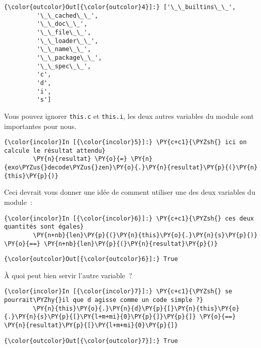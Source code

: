 \begin{Verbatim}[commandchars=\\\{\}]
{\color{outcolor}Out[{\color{outcolor}4}]:} ['\_\_builtins\_\_',
         '\_\_cached\_\_',
         '\_\_doc\_\_',
         '\_\_file\_\_',
         '\_\_loader\_\_',
         '\_\_name\_\_',
         '\_\_package\_\_',
         '\_\_spec\_\_',
         'c',
         'd',
         'i',
         's']
\end{Verbatim}
            
    Vous pouvez ignorer \texttt{this.c} et \texttt{this.i}, les deux autres
variables du module sont importantes pour nous.

    \begin{Verbatim}[commandchars=\\\{\}]
{\color{incolor}In [{\color{incolor}5}]:} \PY{c+c1}{\PYZsh{} ici on calcule le résultat attendu}
        \PY{n}{resultat} \PY{o}{=} \PY{n}{exo\PYZus{}decode\PYZus{}zen}\PY{o}{.}\PY{n}{resultat}\PY{p}{(}\PY{n}{this}\PY{p}{)}
\end{Verbatim}


    Ceci devrait vous donner une idée de comment utiliser une des deux
variables du module~:

    \begin{Verbatim}[commandchars=\\\{\}]
{\color{incolor}In [{\color{incolor}6}]:} \PY{c+c1}{\PYZsh{} ces deux quantités sont égales}
        \PY{n+nb}{len}\PY{p}{(}\PY{n}{this}\PY{o}{.}\PY{n}{s}\PY{p}{)} \PY{o}{==} \PY{n+nb}{len}\PY{p}{(}\PY{n}{resultat}\PY{p}{)}
\end{Verbatim}


\begin{Verbatim}[commandchars=\\\{\}]
{\color{outcolor}Out[{\color{outcolor}6}]:} True
\end{Verbatim}
            
    À quoi peut bien servir l'autre variable~?

    \begin{Verbatim}[commandchars=\\\{\}]
{\color{incolor}In [{\color{incolor}7}]:} \PY{c+c1}{\PYZsh{} se pourrait\PYZhy{}il que d agisse comme un code simple ?}
        \PY{n}{this}\PY{o}{.}\PY{n}{d}\PY{p}{[}\PY{n}{this}\PY{o}{.}\PY{n}{s}\PY{p}{[}\PY{l+m+mi}{0}\PY{p}{]}\PY{p}{]} \PY{o}{==} \PY{n}{resultat}\PY{p}{[}\PY{l+m+mi}{0}\PY{p}{]}
\end{Verbatim}


\begin{Verbatim}[commandchars=\\\{\}]
{\color{outcolor}Out[{\color{outcolor}7}]:} True
\end{Verbatim}
            
